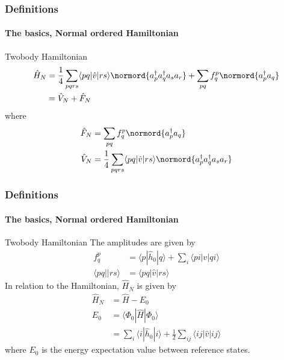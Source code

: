 \documentclass[compress]{beamer}
\newcommand*{\ket}[1]{|#1\rangle}
\newcommand*{\bra}[1]{\langle#1|}
\newcommand{\element}[3]
        {\bra{#1}#2\ket{#3}}
\begin{document}
\begin{frame}
    \frametitle{Definitions}
    \framesubtitle{The basics, Normal ordered Hamiltonian}

    \begin{block}{Twobody Hamiltonian}
    \begin{align*}
        \hat{H}_N &= 
            \frac{1}{4} \sum_{pqrs} \bra{pq}\hat{v}\ket{rs} \normord{a^\dagger_p a^\dagger_q a_s  a_r} 
            + \sum_{pq} f_q^p \normord{a^\dagger_p a_q} \\
        &= \hat{V}_N + \hat{F}_N
    \end{align*}
    where
    \begin{subequations}
    \begin{align*}
        \hat{F}_N &= \sum_{pq} f_q^p \normord{a^\dagger_p a_q} \\
        \hat{V}_N &= \frac{1}{4} \sum_{pqrs} \bra{pq}\hat{v}\ket{rs} \normord{a^\dagger_p a^\dagger_q a_s  a_r} \\
    \end{align*}
    \end{subequations}
    \end{block}
\end{frame}
\begin{frame}[fragile]
    \frametitle{Definitions}
    \framesubtitle{The basics, Normal ordered Hamiltonian}

    \small
    \begin{block}{Twobody Hamiltonian}
    The amplitudes are given by
    \begin{subequations}
    \begin{align*}
        f_q^p &= \element{p}{\hat{h}_0}{q} + \sum_i \element{pi}{\hat{v}}{qi} \\
        \bra{pq}\ket{rs} &= \element{pq}{\hat{v}}{rs}
    \end{align*}
    \end{subequations}
    In relation to the Hamiltonian, $\hat{H}_N$ is given by
    \begin{align*}
        \hat{H}_N &= \hat{H} - E_0 \\
        E_0 &= \element{\Phi_0}{\hat{H}}{\Phi_0} \\
            &= \sum_i \element{i}{\hat{h}_0}{i}
                + \frac{1}{2} \sum_{ij} \element{ij}{\hat{v}}{ij}
    \end{align*}
    where $E_0$ is the energy expectation value between reference states.
    \end{block}
\end{frame}
\end{document}
